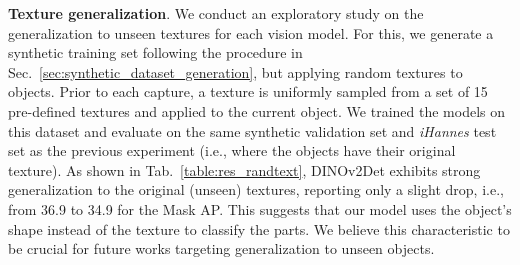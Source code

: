 \begin{comment}
\begin{figure}
    \centering
    \texttt{[image: Figures/randtext-removebg.png]}
    \caption{The 15 random textures on \texttt{006\_mustard\_bottle}.
    }
    \label{fig:randtext}
    \vspace{-0.6cm}
\end{figure}
\end{comment}

\begin{comment}
\begin{figure*}
    \centering
    \vspace{+0.3cm}
    \texttt{[image: Figures/phases.png]}
    \caption{The phases of the prosthetic grasping pipeline along with the components involved and output visualizations.}
    \label{fig:phases}
    \vspace{-0.60cm}
\end{figure*}
\end{comment}

\noindent\textbf{Texture generalization}. 
We conduct an exploratory study on the generalization to unseen textures for each vision model. For this, we generate a synthetic training set following the procedure in Sec.~\ref{sec:synthetic_dataset_generation}, but applying random textures to objects. Prior to each capture, a texture is uniformly sampled from a set of 15 pre-defined textures and applied to the current object. We trained the models on this dataset and evaluate on the same synthetic validation set and \textit{iHannes} test set as the previous experiment (i.e., where the objects have their original texture). As shown in Tab.~\ref{table:res_randtext}, DINOv2Det exhibits strong generalization to the original (unseen) textures, reporting only a slight drop, i.e., from 36.9 to 34.9 for the Mask AP. This suggests that our model uses the object's shape instead of the texture to classify the parts. We believe this characteristic to be crucial for future works targeting generalization to unseen objects.
